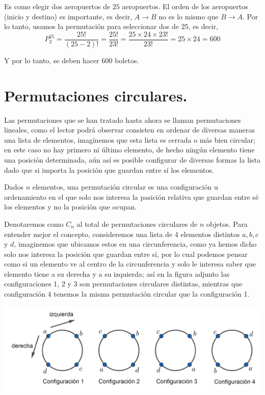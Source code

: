 \begin{solucion}
Es como elegir dos aeropuertos de $25$ aeropuertos. El orden de los aeropuertos (inicio y destino) es importante, es decir, $A\longrightarrow B$ no es lo mismo que $B\longrightarrow A$. Por lo tanto, usamos la permutación para seleccionar dos de $25$, es decir,
\[P^{25}_2=\frac{25!}{(25-2)!}=\frac{25!}{23!}=\frac{25\times 24\times 23!}{23!}=25\times 24=600\]
\end{solucion}
Y por lo tanto, se deben hacer $600$ boletos.
\section{Permutaciones circulares.}

Las permutaciones que se han tratado hasta ahora se llaman permutaciones lineales, como el lector podrá observar consisten en ordenar de diversas maneras una lista de elementos, imagínemos que esta lista es cerrada o más bien circular; en este caso no hay primero ni último elemento, de hecho ningún elemento tiene una posición determinada, aún así es posible configurar de diversas formas la lista dado que si importa la posición que guardan entre sí los elementos.

\begin{definicion} 

Dados $n$ elementos, una permutación circular es una configuración u ordenamiento en el que solo nos interesa la pasición relativa que guardan entre sé los elementos y no la posición que ocupan. 
\end{definicion}

Denotaremos como $C_n$ al total de permutaciones circulares de $n$ objetos. Para entender mejor el concepto, consideremos una lista de 4 elementos distintos $a, b, c$ y $d$, imaginemos que ubicamos estos en una circunferencia, como ya hemos dicho solo nos interesa la posición que guardan entre sí, por lo cual podemos pensar como si un elemento ve al centro de la circunferencia y solo le interesa saber que elemento tiene a su derecha y a su izquierda; así en la figura adjunto las configuraciones 1, 2 y 3 son permutaciones circulares distintas, mientras que configuración 4 tenemos la misma permutación circular que la configuración 1.

\begin{center}
    \includegraphics[scale=0.25]{Imagenes/IMG5/S1-5-01.png}
\end{center}

